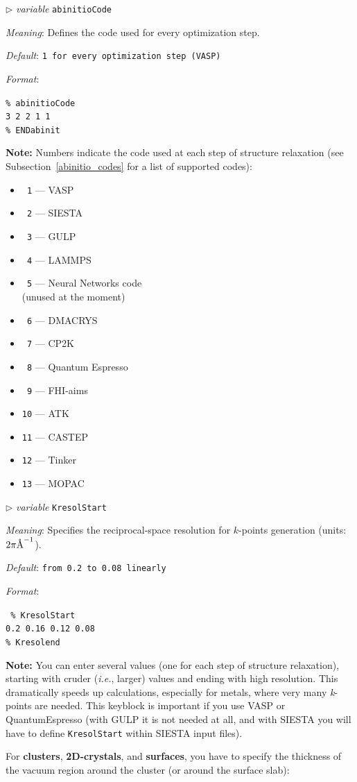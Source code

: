 \documentclass[12pt]{article}
\newcommand{\keyword}[1]{\texttt{#1}}
\newcommand{\paramacro}[6]{
\vspace{0.5cm}
$\triangleright$ \emph{variable} {\color{blue} \texttt{#1}}

\emph{Meaning}: {#2}

{#3}

\emph{Default}: \texttt{#4}

\emph{Format}:

{\addtolength{\leftskip}{10mm} 
\texttt{#5}
\par}


{\small #6}

}
\begin{document}
\paramacro{abinitioCode}{Defines the code used for every optimization step.}{}{1
{\rm for every optimization step (VASP)}}{\% abinitioCode \\
3 2 2 1 1 \\
\% ENDabinit}{
\textbf{Note:} Numbers indicate the code used at each step of structure
relaxation (see Subsection~\ref{abinitio_codes} for a list of supported codes):

\begin{multicols}{2}
\begin{itemize}
\item[] \texttt{ 1} --- VASP
\item[] \texttt{ 2} --- SIESTA
\item[] \texttt{ 3} --- GULP
\item[] \texttt{ 4} --- LAMMPS
\item[] \texttt{ 5} --- Neural Networks code \\
(unused at the moment)
\item[] \texttt{ 6} --- DMACRYS
\item[] \texttt{ 7} --- CP2K
\item[] \texttt{ 8} --- Quantum Espresso
\item[] \texttt{ 9} --- FHI-aims
\item[] \texttt{10} --- ATK
\item[] \texttt{11} --- CASTEP
\item[] \texttt{12} --- Tinker
\item[] \texttt{13} --- MOPAC
\end{itemize}
\end{multicols}
}

\paramacro{KresolStart}{Specifies the reciprocal-space resolution for $k$-points
generation (units: $2\pi\text{\r{A}}^{-1}$).}{}{\rm from 0.2 to 0.08 linearly}{
\% KresolStart \\
0.2 0.16 0.12 0.08 \\
\% Kresolend}{
\textbf{Note:} You can enter several values (one for each step of structure
relaxation), starting with cruder (\emph{i.e.}, larger) values and ending with
high resolution. This dramatically speeds up calculations, especially for
metals, where very many \emph{k}-points are needed. This keyblock is important
if you use VASP or QuantumEspresso (with GULP it is not needed at all, and with
SIESTA you will have to define \keyword{KresolStart} within SIESTA input
files).}


\vspace{0.5cm}
For \textbf{clusters}, \textbf{2D-crystals}, and \textbf{surfaces}, you have to
specify the thickness of the vacuum region around the cluster (or around the
surface slab):
\end{document}
